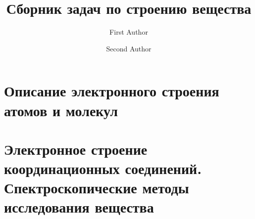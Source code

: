\documentclass[openright,a5paper,twoside]{book}
\title{Сборник задач по строению вещества}
\author{First Author \and Second Author}
\begin{document}
\frontmatter



%

%

%



%

\footnotesize
\tableofcontents

\mainmatter

\chapter[Описание электронного строения  атомов и молекул]{\texorpdfstring{Описание электронного строения\\атомов и молекул}{Описание электронного строения  атомов и молекул}}
\thispagestyle{empty}













\chapter[Электронное строение координационных соединений.\\Спектроскопические методы исследования вещества]{\texorpdfstring{Электронное строение\\координационных соединений.\\Спектроскопические методы исследования вещества}{Электронное строение координационных соединений. Спектроскопические методы исследования вещества}}
\thispagestyle{empty}
\end{document}
